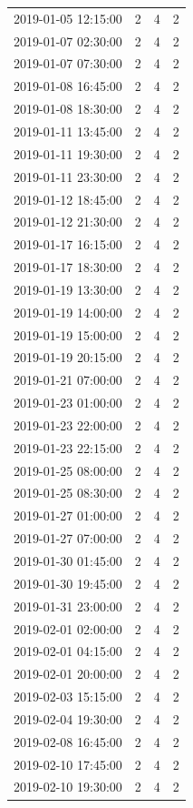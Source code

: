 \begin{tabular}{lrrr}
2019-01-05 12:15:00 & 2 & 4 & 2 \\
2019-01-07 02:30:00 & 2 & 4 & 2 \\
2019-01-07 07:30:00 & 2 & 4 & 2 \\
2019-01-08 16:45:00 & 2 & 4 & 2 \\
2019-01-08 18:30:00 & 2 & 4 & 2 \\
2019-01-11 13:45:00 & 2 & 4 & 2 \\
2019-01-11 19:30:00 & 2 & 4 & 2 \\
2019-01-11 23:30:00 & 2 & 4 & 2 \\
2019-01-12 18:45:00 & 2 & 4 & 2 \\
2019-01-12 21:30:00 & 2 & 4 & 2 \\
2019-01-17 16:15:00 & 2 & 4 & 2 \\
2019-01-17 18:30:00 & 2 & 4 & 2 \\
2019-01-19 13:30:00 & 2 & 4 & 2 \\
2019-01-19 14:00:00 & 2 & 4 & 2 \\
2019-01-19 15:00:00 & 2 & 4 & 2 \\
2019-01-19 20:15:00 & 2 & 4 & 2 \\
2019-01-21 07:00:00 & 2 & 4 & 2 \\
2019-01-23 01:00:00 & 2 & 4 & 2 \\
2019-01-23 22:00:00 & 2 & 4 & 2 \\
2019-01-23 22:15:00 & 2 & 4 & 2 \\
2019-01-25 08:00:00 & 2 & 4 & 2 \\
2019-01-25 08:30:00 & 2 & 4 & 2 \\
2019-01-27 01:00:00 & 2 & 4 & 2 \\
2019-01-27 07:00:00 & 2 & 4 & 2 \\
2019-01-30 01:45:00 & 2 & 4 & 2 \\
2019-01-30 19:45:00 & 2 & 4 & 2 \\
2019-01-31 23:00:00 & 2 & 4 & 2 \\
2019-02-01 02:00:00 & 2 & 4 & 2 \\
2019-02-01 04:15:00 & 2 & 4 & 2 \\
2019-02-01 20:00:00 & 2 & 4 & 2 \\
2019-02-03 15:15:00 & 2 & 4 & 2 \\
2019-02-04 19:30:00 & 2 & 4 & 2 \\
2019-02-08 16:45:00 & 2 & 4 & 2 \\
2019-02-10 17:45:00 & 2 & 4 & 2 \\
2019-02-10 19:30:00 & 2 & 4 & 2 \\

\end{tabular}
